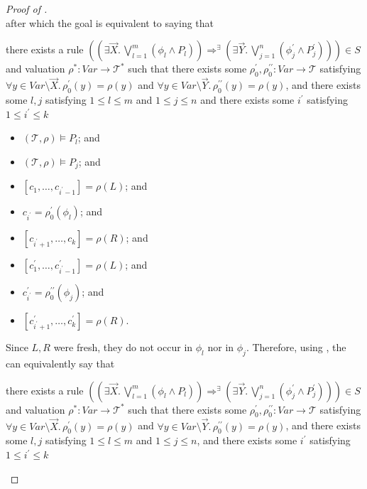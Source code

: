 \documentclass{article}
\newenvironment{proofenv}
  {
    \VerbatimEnvironment\begin{tcolorbox}[colback=black!0!white] %
  }
  {
   \end{tcolorbox}
  }
\begin{document}
\begin{proof}[Proof of ]
\begin{equation*}
\end{equation*}
after which the goal is equivalent to saying that
\begin{proofenv}
there exists a rule $((\exists \vec{X}.\, \bigvee_{l=1}^{m} (\phi_l \land P_l)) \Rightarrow^\exists (\exists \vec{Y}.\, \bigvee_{j=1}^{n} (\phi^\prime_j \land P^\prime_j))) \in S$
and valuation $\rho^* : \mathit{Var} \to \mathcal{T}^*$ such that
there exists some $\rho_0^\prime,\rho_0^{\prime\prime} : \mathit{Var} \to \mathcal{T}$
satisfying $\forall y \in \mathit{Var} \setminus \vec{X}.\, \rho_0^\prime(y) = \rho(y)$
and $\forall y \in \mathit{Var} \setminus \vec{Y}.\, \rho_0^{\prime\prime}(y) = \rho(y)$,
and there exists some $l,j$ satisfying $1 \leq l \leq m$ and $1 \leq j \leq n$
and there exists some $i^\prime$ satisfying $1 \leq i^\prime \leq k$
\begin{itemize}
    \item $(\mathcal{T}, \rho) \vDash P_l$; and
    \item $(\mathcal{T}, \rho) \vDash P_j$; and
    \item $[c_1,\ldots, c_{i^\prime-1}] = \rho(L)$; and
    \item $c_{i^\prime} = \rho_0^\prime(\phi_l)$; and
    \item $[c_{i^\prime+1},\ldots,c_k] = \rho(R)$; and
    \item $[c^\prime_1,\ldots, c^\prime_{i^\prime-1}] = \rho(L)$; and
    \item $c^\prime_{i^\prime} = \rho_0^{\prime\prime}(\phi_j)$; and
    \item $[c^\prime_{i^\prime+1},\ldots,c^\prime_k] = \rho(R)$.
\end{itemize}
\end{proofenv}
Since $L,R$ were fresh, they do not occur in $\phi_l$ nor in $\phi_j$.
Therefore, using , the can equivalently say that
\begin{proofenv}
there exists a rule $((\exists \vec{X}.\, \bigvee_{l=1}^{m} (\phi_l \land P_l)) \Rightarrow^\exists (\exists \vec{Y}.\, \bigvee_{j=1}^{n} (\phi^\prime_j \land P^\prime_j))) \in S$
and valuation $\rho^* : \mathit{Var} \to \mathcal{T}^*$ such that
there exists some $\rho_0^\prime,\rho_0^{\prime\prime} : \mathit{Var} \to \mathcal{T}$
satisfying $\forall y \in \mathit{Var} \setminus \vec{X}.\, \rho_0^\prime(y) = \rho(y)$
and $\forall y \in \mathit{Var} \setminus \vec{Y}.\, \rho_0^{\prime\prime}(y) = \rho(y)$,
and there exists some $l,j$ satisfying $1 \leq l \leq m$ and $1 \leq j \leq n$,
and there exists some $i^\prime$ satisfying $1 \leq i^\prime \leq k$

\end{proofenv}
\end{proof}
\end{document}
